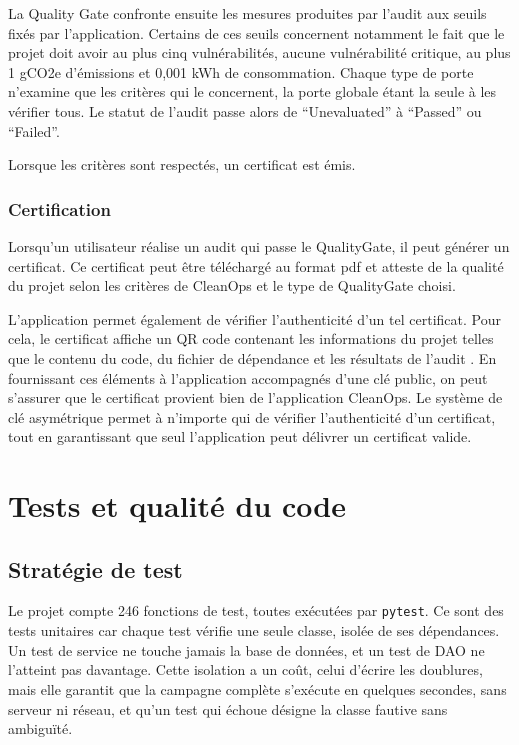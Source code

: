 \documentclass[a4paper,12pt]{article}
\begin{document}
La Quality Gate confronte ensuite les mesures produites par l'audit aux
seuils fixés par l'application. Certains de ces seuils concernent
notamment le fait que le projet doit avoir au plus cinq vulnérabilités,
aucune vulnérabilité critique, au plus 1 gCO2e d'émissions et 0,001 kWh
de consommation. Chaque type de porte n'examine que les critères qui le
concernent, la porte globale étant la seule à les vérifier tous. Le
statut de l'audit passe alors de ``Unevaluated'' à ``Passed'' ou
``Failed''.

Lorsque les critères sont respectés, un certificat est émis.

\subsubsection{Certification}\label{certification}

Lorsqu'un utilisateur réalise un audit qui passe le QualityGate, il peut
générer un certificat. Ce certificat peut être téléchargé au format pdf
et atteste de la qualité du projet selon les critères de CleanOps et le
type de QualityGate choisi.

L'application permet également de vérifier l'authenticité d'un tel
certificat. Pour cela, le certificat affiche un QR code contenant les
informations du projet telles que le contenu du code, du fichier de
dépendance et les résultats de l'audit . En fournissant ces éléments à
l'application accompagnés d'une clé public, on peut s'assurer que le
certificat provient bien de l'application CleanOps. Le système de clé
asymétrique permet à n'importe qui de vérifier l'authenticité d'un
certificat, tout en garantissant que seul l'application peut délivrer un
certificat valide.

\newpage{}

\section{Tests et qualité du code}\label{tests-et-qualituxe9-du-code}

\subsection{Stratégie de test}\label{stratuxe9gie-de-test}

Le projet compte 246 fonctions de test, toutes exécutées par
\texttt{pytest}. Ce sont des tests unitaires car chaque test vérifie une
seule classe, isolée de ses dépendances. Un test de service ne touche
jamais la base de données, et un test de DAO ne l'atteint pas davantage.
Cette isolation a un coût, celui d'écrire les doublures, mais elle
garantit que la campagne complète s'exécute en quelques secondes, sans
serveur ni réseau, et qu'un test qui échoue désigne la classe fautive
sans ambiguïté.
\end{document}

